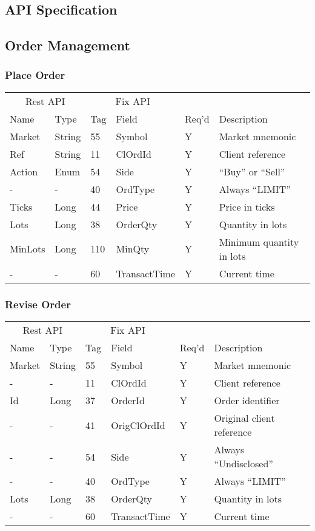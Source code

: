 \documentclass[12pt,a4paper,notitlepage,bibliography=totoc]{scrreprt}
\begin{document}
\begin{appendices}

\chapter{API Specification}

\section{Order Management}

\subsection{Place Order}

\vspace{5mm}
\begin{tabular}{ll|ll|ll}
\multicolumn{2}{c}{Rest API}&\multicolumn{2}{c}{Fix API}\\
Name&Type&Tag&Field&Req'd&Description\\
\hline
Market&String&55&Symbol&Y&Market mnemonic\\
Ref&String&11&ClOrdId&Y&Client reference\\
Action&Enum&54&Side&Y&``Buy'' or ``Sell''\\
-&-&40&OrdType&Y&Always ``LIMIT''\\
Ticks&Long&44&Price&Y&Price in ticks\\
Lots&Long&38&OrderQty&Y&Quantity in lots\\
MinLots&Long&110&MinQty&Y&Minimum quantity in lots\\
-&-&60&TransactTime&Y&Current time\\
\end{tabular}
\vspace{5mm}

\subsection{Revise Order}

\vspace{5mm}
\begin{tabular}{ll|ll|ll}
\multicolumn{2}{c}{Rest API}&\multicolumn{2}{c}{Fix API}\\
Name&Type&Tag&Field&Req'd&Description\\
\hline
Market&String&55&Symbol&Y&Market mnemonic\\
-&-&11&ClOrdId&Y&Client reference\\
Id&Long&37&OrderId&Y&Order identifier\\
-&-&41&OrigClOrdId&Y&Original client reference\\
-&-&54&Side&Y&Always ``Undisclosed''\\
-&-&40&OrdType&Y&Always ``LIMIT''\\
Lots&Long&38&OrderQty&Y&Quantity in lots\\
-&-&60&TransactTime&Y&Current time\\
\end{tabular}
\vspace{5mm}


\end{appendices}
\end{document}
